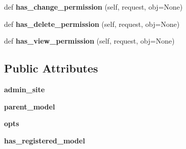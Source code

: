 \begin{DoxyCompactItemize}
def {\bfseries has\+\_\+change\+\_\+permission} (self, request, obj=None)
\item 
\mbox{\label{classdjango_1_1contrib_1_1admin_1_1options_1_1_inline_model_admin_aeb92da81128a6a306af87e27e8874c43}} 
def {\bfseries has\+\_\+delete\+\_\+permission} (self, request, obj=None)
\item 
\mbox{\label{classdjango_1_1contrib_1_1admin_1_1options_1_1_inline_model_admin_a53c09225125f5ccc8de8f93a6801a8d0}} 
def {\bfseries has\+\_\+view\+\_\+permission} (self, request, obj=None)
\end{DoxyCompactItemize}
\subsection*{Public Attributes}
\begin{DoxyCompactItemize}
\item 
\mbox{\label{classdjango_1_1contrib_1_1admin_1_1options_1_1_inline_model_admin_af17cb7f7f2b9263c91c9ff5d0e13fa7a}} 
{\bfseries admin\+\_\+site}
\item 
\mbox{\label{classdjango_1_1contrib_1_1admin_1_1options_1_1_inline_model_admin_aa58cdb362b2655645f0f7a5af1bb46af}} 
{\bfseries parent\+\_\+model}
\item 
\mbox{\label{classdjango_1_1contrib_1_1admin_1_1options_1_1_inline_model_admin_a25fdd704dc4b4ce74cc4e6408673d20e}} 
{\bfseries opts}
\item 
\mbox{\label{classdjango_1_1contrib_1_1admin_1_1options_1_1_inline_model_admin_a921202925ad6ef28c81904297915a3f3}} 
{\bfseries has\+\_\+registered\+\_\+model}
\end{DoxyCompactItemize}
